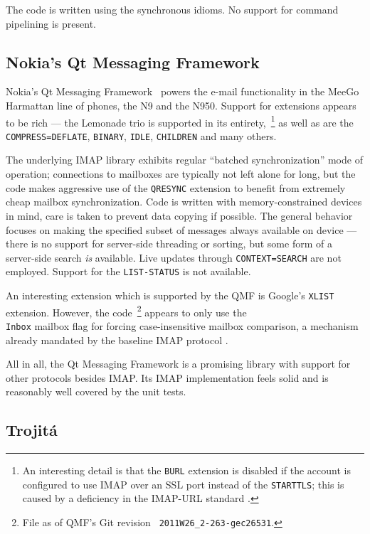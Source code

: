 \documentclass[trojita]{subfiles}
\begin{document}
The code is written using the synchronous idioms. No support for command pipelining is present.

\subsection{Nokia's Qt Messaging Framework}

Nokia's Qt Messaging Framework~\cite{qmf} powers the e-mail functionality in the MeeGo Harmattan line of phones, the N9
and the N950.  Support for extensions appears to be rich --- the Lemonade trio is supported in its
entirety,~\footnote{An interesting detail is that the {\tt BURL} extension is disabled if the account is configured to
use IMAP over an SSL port instead of the {\tt STARTTLS}; this is caused by a deficiency in the IMAP-URL standard
\cite{rfc5092}.} as well as are the {\tt COMPRESS=DEFLATE}, {\tt BINARY}, {\tt IDLE}, {\tt CHILDREN} and many others.

The underlying IMAP library exhibits regular ``batched synchronization'' mode of operation; connections to mailboxes are
typically not left alone for long, but the code makes aggressive use of the {\tt QRESYNC} extension to benefit from
extremely cheap mailbox synchronization.  Code is written with memory-constrained devices in mind, care is taken to
prevent data copying if possible.  The general behavior focuses on making the specified subset of messages always
available on device --- there is no support for server-side threading or sorting, but some form of a server-side search
{\em is} available.  Live updates through {\tt CONTEXT=SEARCH} are not employed.  Support for the {\tt LIST-STATUS} is
not available.

An interesting extension which is supported by the QMF is Google's {\tt XLIST} \cite{gmail-xlist} extension.  However,
the code~\footnote{File  as of QMF's Git revision {\tt
2011W26\_2-263-gec26531}.} appears to only use the {\tt \\Inbox} mailbox flag for forcing case-insensitive mailbox
comparison, a mechanism already mandated by the baseline IMAP protocol \cite[p. 17]{rfc3501}.

All in all, the Qt Messaging Framework is a promising library with support for other protocols besides IMAP.  Its IMAP
implementation feels solid and is reasonably well covered by the unit tests.

\subsection{Trojitá}
\end{document}
